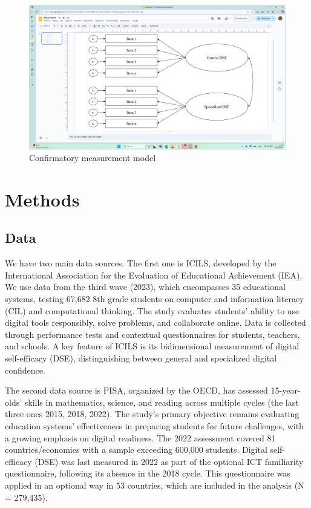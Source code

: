 \documentclass[
  letterpaper,
  DIV=11,
  numbers=noendperiod]{scrartcl}
\begin{document}
\begin{figure}[H]

{\centering \includegraphics{images/figure1.png}

}

\caption{Confirmatory measurement model}

\end{figure}%

\section{Methods}\label{methods}

\subsection{Data}\label{data}

We have two main data sources. The first one is ICILS, developed by the
International Association for the Evaluation of Educational Achievement
(IEA). We use data from the third wave (2023), which encompasses 35
educational systems, testing 67,682 8th grade students on computer and
information literacy (CIL) and computational thinking. The study
evaluates students' ability to use digital tools responsibly, solve
problems, and collaborate online. Data is collected through performance
tests and contextual questionnaires for students, teachers, and schools.
A key feature of ICILS is its bidimensional measurement of digital
self-efficacy (DSE), distinguishing between general and specialized
digital confidence.

The second data source is PISA, organized by the OECD, has assessed
15-year-olds' skills in mathematics, science, and reading across
multiple cycles (the last three ones 2015, 2018, 2022). The study's
primary objective remains evaluating education systems' effectiveness in
preparing students for future challenges, with a growing emphasis on
digital readiness. The 2022 assessment covered 81 countries/economies
with a sample exceeding 600,000 students. Digital self-efficacy (DSE)
was last measured in 2022 as part of the optional ICT familiarity
questionnaire, following its absence in the 2018 cycle. This
questionnaire was applied in an optional way in 53 countries, which are
included in the analysis (N = 279,435).
\end{document}
